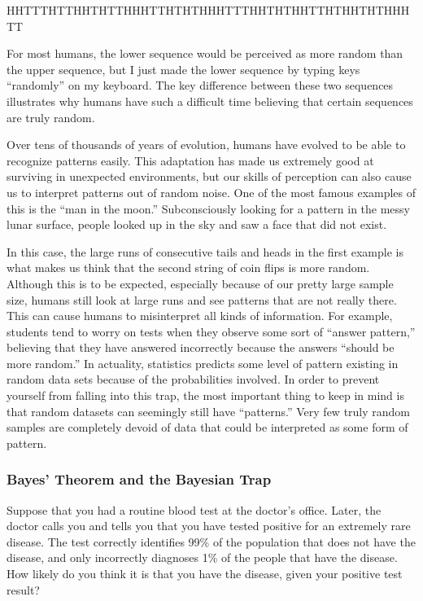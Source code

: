\begin{center}
    HHTTTHTTHHTHTTHHHTTHTHTHHHTTTHHTHTHHTTHTHHTHTHHHTT
\end{center}

For most humans, the lower sequence would be perceived as more random than the upper sequence, but I just made the lower sequence by typing keys “randomly” on my keyboard. The key difference between these two sequences illustrates why humans have such a difficult time believing that certain sequences are truly random.

Over tens of thousands of years of evolution, humans have evolved to be able to recognize patterns easily. This adaptation has made us extremely good at surviving in unexpected environments, but our skills of perception can also cause us to interpret patterns out of random noise. One of the most famous examples of this is the “man in the moon.” Subconsciously looking for a pattern in the messy lunar surface, people looked up in the sky and saw a face that did not exist. 

In this case, the large runs of consecutive tails and heads in the first example is what makes us think that the second string of coin flips is more random. Although this is to be expected, especially because of our pretty large sample size, humans still look at large runs and see patterns that are not really there. This can cause humans to misinterpret all kinds of information. For example, students tend to worry on tests when they observe some sort of “answer pattern,” believing that they have answered incorrectly because the answers “should be more random.” In actuality, statistics predicts some level of pattern existing in random data sets because of the probabilities involved. In order to prevent yourself from falling into this trap, the most important thing to keep in mind is that random datasets can seemingly still have “patterns.” Very few truly random samples are completely devoid of data that could be interpreted as some form of pattern.

\subsubsection*{Bayes’ Theorem and the Bayesian Trap}

Suppose that you had a routine blood test at the doctor’s office. Later, the doctor calls you and tells you that you have tested positive for an extremely rare disease. The test correctly identifies 99\% of the population that does not have the disease, and only incorrectly diagnoses 1\% of the people that have the disease. How likely do you think it is that you have the disease, given your positive test result?

